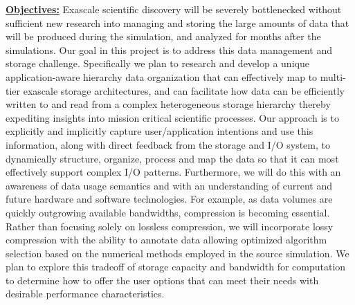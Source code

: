 \documentclass[11pt,letterpaper]{article}
\begin{document}
\underline{\textbf{Objectives:}} Exascale scientific discovery will
be severely bottlenecked without sufficient new 
 research into managing and storing the large amounts of 
data that will be produced during the simulation, and analyzed for months after the simulations.
Our goal in this project is to address this data management and storage challenge. Specifically we plan
 to research and develop a unique application-aware hierarchy data organization that can effectively map 
 to  multi-tier exascale storage architectures, and can facilitate how data can be efficiently written to and 
 read from a complex heterogeneous storage hierarchy  
 thereby expediting insights into mission critical scientific processes. 
%
%
Our approach is to explicitly and implicitly capture user/application intentions 
and use this information, along with direct feedback from the storage and I/O 
system, to dynamically structure, organize, process and map the data so that 
it can most effectively support complex I/O patterns. Furthermore, we will do 
this with an awareness of data usage semantics and with an understanding 
of current and future hardware and software technologies. 
For example, as data volumes are quickly outgrowing available bandwidths, 
compression is becoming essential. Rather than focusing solely on lossless 
compression, we will incorporate lossy compression with the ability to annotate 
data allowing optimized algorithm selection based on the numerical methods 
employed in the source simulation. We plan to explore this tradeoff of storage 
capacity and bandwidth for computation to determine how to offer the user 
options that can meet their needs with desirable performance characteristics.
\end{document}
